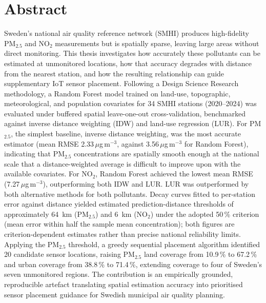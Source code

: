 \documentclass[11pt,a4paper]{article}
\let\oldsection\section
\renewcommand{\section}{\FloatBarrier\oldsection}
\begin{document}
\section*{Abstract}

Sweden's national air quality reference network (SMHI) produces high-fidelity PM$_{2.5}$ and NO$_2$ measurements but is spatially sparse, leaving large areas without direct monitoring. This thesis investigates how accurately these pollutants can be estimated at unmonitored locations, how that accuracy degrades with distance from the nearest station, and how the resulting relationship can guide supplementary IoT sensor placement. Following a Design Science Research methodology, a Random Forest model trained on land-use, topographic, meteorological, and population covariates for 34 SMHI stations (2020--2024) was evaluated under buffered spatial leave-one-out cross-validation, benchmarked against inverse distance weighting (IDW) and land-use regression (LUR). For PM$_{2.5}$, the simplest baseline, inverse distance weighting, was the most accurate estimator (mean RMSE 2.33\,$\mu$g\,m$^{-3}$, against 3.56\,$\mu$g\,m$^{-3}$ for Random Forest), indicating that PM$_{2.5}$ concentrations are spatially smooth enough at the national scale that a distance-weighted average is difficult to improve upon with the available covariates. For NO$_2$, Random Forest achieved the lowest mean RMSE (7.27\,$\mu$g\,m$^{-3}$), outperforming both IDW and LUR. LUR was outperformed by both alternative methods for both pollutants. Decay curves fitted to per-station error against distance yielded estimated prediction-distance thresholds of approximately 64~km (PM$_{2.5}$) and 6~km (NO$_2$) under the adopted 50\,\% criterion (mean error within half the sample mean concentration); both figures are criterion-dependent estimates rather than precise national reliability limits. Applying the PM$_{2.5}$ threshold, a greedy sequential placement algorithm identified 20 candidate sensor locations, raising PM$_{2.5}$ land coverage from 10.9\,\% to 67.2\,\% and urban coverage from 38.8\,\% to 71.4\,\%, extending coverage to four of Sweden's seven unmonitored regions. The contribution is an empirically grounded, reproducible artefact translating spatial estimation accuracy into prioritised sensor placement guidance for Swedish municipal air quality planning.

\clearpage

\end{document}

